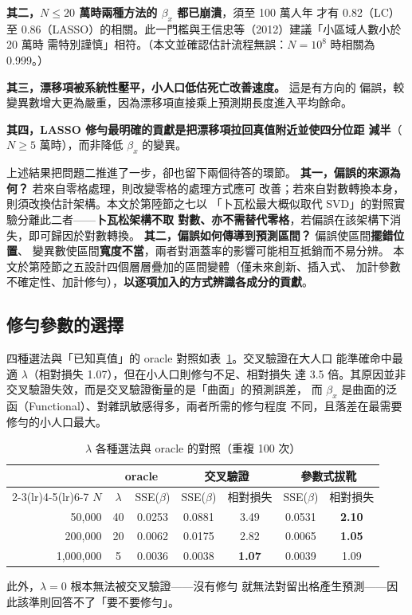 \documentclass[UTF8, fontset=macnew, a4paper, 12pt]{ctexart}
\begin{document}
\textbf{其二，$N\le20$ 萬時兩種方法的 $\beta_x$ 都已崩潰}，須至 100 萬人年
才有 0.82（LC）至 0.86（LASSO）的相關。此一門檻與王信忠等（2012）建議「小區域人數小於 20 萬時
需特別謹慎」相符。（本文並確認估計流程無誤：$N=10^8$ 時相關為 0.999。）

\textbf{其三，漂移項被系統性壓平，小人口低估死亡改善速度。} 這是有方向的
偏誤，較變異數增大更為嚴重，因為漂移項直接乘上預測期長度進入平均餘命。

\textbf{其四，LASSO 修勻最明確的貢獻是把漂移項拉回真值附近並使四分位距
減半}（$N\ge5$ 萬時），而非降低 $\beta_x$ 的變異。

\vspace{4pt}
上述結果把問題二推進了一步，卻也留下兩個待答的環節。
\textbf{其一，偏誤的來源為何？} 若來自零格處理，則改變零格的處理方式應可
改善；若來自對數轉換本身，則須改換估計架構。本文於第陸節之七以
「卜瓦松最大概似取代 SVD」的對照實驗分離此二者——\textbf{卜瓦松架構不取
對數、亦不需替代零格}，若偏誤在該架構下消失，即可歸因於對數轉換。
\textbf{其二，偏誤如何傳導到預測區間？} 偏誤使區間\textbf{擺錯位置}、
變異數使區間\textbf{寬度不當}，兩者對涵蓋率的影響可能相互抵銷而不易分辨。
本文於第陸節之五設計四個層層疊加的區間變體（僅未來創新、插入式、
加計參數不確定性、加計修勻），\textbf{以逐項加入的方式辨識各成分的貢獻}。

\subsection{修勻參數的選擇}

四種選法與「已知真值」的 oracle 對照如表~\ref{tab:lamsel}。交叉驗證在大人口
能準確命中最適 $\lambda$（相對損失 1.07），但在小人口則修勻不足、相對損失
達 3.5 倍。其原因並非交叉驗證失效，而是交叉驗證衡量的是「曲面」的預測誤差，
而 $\beta_x$ 是曲面的泛函（Functional）、對雜訊敏感得多，兩者所需的修勻程度
不同，且落差在最需要修勻的小人口最大。

\begin{table}[H]
\centering
\caption{$\lambda$ 各種選法與 oracle 的對照（重複 100 次）}
\small
\begin{tabular}{rcccccc}
\toprule
& \multicolumn{2}{c}{oracle} & \multicolumn{2}{c}{交叉驗證}
& \multicolumn{2}{c}{參數式拔靴}\\
\cmidrule(lr){2-3}\cmidrule(lr){4-5}\cmidrule(lr){6-7}
$N$ & $\lambda$ & SSE($\beta$) & SSE($\beta$) & 相對損失
    & SSE($\beta$) & 相對損失\\
\midrule
50,000    & 40 & 0.0253 & 0.0881 & 3.49 & 0.0531 & \textbf{2.10}\\
200,000   & 20 & 0.0062 & 0.0175 & 2.82 & 0.0065 & \textbf{1.05}\\
1,000,000 & \phantom{0}5 & 0.0036 & 0.0038 & \textbf{1.07} & 0.0039 & 1.09\\
\bottomrule
\end{tabular}
\label{tab:lamsel}
\end{table}
此外，$\lambda=0$ 根本無法被交叉驗證——沒有修勻
就無法對留出格產生預測——因此該準則回答不了「要不要修勻」。
\end{document}
